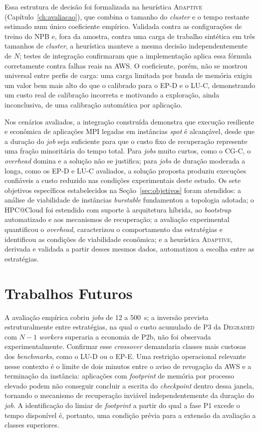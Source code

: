 Essa estrutura de decisão foi formalizada na heurística \textsc{Adaptive}
(Capítulo~\ref{ch:avaliacao}), que combina o tamanho do \textit{cluster} e o
tempo restante estimado num único coeficiente empírico. Validada contra as
configurações de treino do NPB e, fora da amostra, contra uma carga de
trabalho sintética em três tamanhos de \textit{cluster}, a heurística manteve
a mesma decisão independentemente de $N$; testes de integração confirmaram
que a implementação aplica essa fórmula corretamente contra falhas reais na
AWS. O coeficiente, porém, não se mostrou universal entre perfis de carga:
uma carga limitada por banda de memória exigiu um valor bem mais alto do que
o calibrado para o EP-D e o LU-C, demonstrando um custo real de calibração
incorreta e motivando a exploração, ainda inconclusiva, de uma calibração
automática por aplicação.

Nos cenários avaliados, a integração construída demonstra que execução resiliente e
econômica de aplicações MPI legadas em instâncias \textit{spot} é alcançável, desde que
a duração do \textit{job} seja suficiente para que o custo fixo de recuperação represente
uma fração minoritária do tempo total. Para \textit{jobs} muito curtos, como o CG-C, o
\textit{overhead} domina e a solução não se justifica; para \textit{jobs} de duração
moderada a longa, como os EP-D e LU-C avaliados, a solução proposta produziu execuções
confiáveis a custo reduzido nas condições experimentais deste estudo. Os sete objetivos
específicos estabelecidos na Seção~\ref{sec:objetivos} foram atendidos: a análise de
viabilidade de instâncias \textit{burstable} fundamentou a topologia adotada; o
HPC@Cloud foi estendido com suporte à arquitetura híbrida, ao \textit{bootstrap}
automatizado e aos mecanismos de recuperação; a avaliação experimental quantificou o
\textit{overhead}, caracterizou o comportamento das estratégias e identificou as
condições de viabilidade econômica; e a heurística \textsc{Adaptive}, derivada e
validada a partir desses mesmos dados, automatizou a escolha entre as estratégias.

\section{Trabalhos Futuros}
\label{sec:trabalhos-futuros}

A avaliação empírica cobriu \textit{jobs} de 12 a 500~s; a inversão prevista
estruturalmente entre estratégias, na qual o custo acumulado de P3 da \textsc{Degraded}
com $N{-}1$ \textit{workers} superaria a economia de P2b, não foi observada
experimentalmente. Confirmar esse \textit{crossover} demandaria classes mais custosas
dos \textit{benchmarks}, como o LU-D ou o EP-E. Uma restrição operacional relevante
nesse contexto é o limite de dois minutos entre o aviso de revogação da AWS e a
terminação da instância: aplicações com \textit{footprint} de memória por processo
elevado podem não conseguir concluir a escrita do \textit{checkpoint} dentro dessa
janela, tornando o mecanismo de recuperação inviável independentemente da duração do
\textit{job}. A identificação do limiar de \textit{footprint} a partir do qual a fase
P1 excede o tempo disponível é, portanto, uma condição prévia para a extensão da
avaliação a classes superiores.

